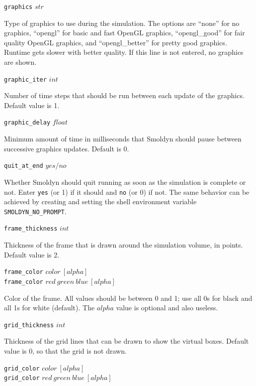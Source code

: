 \documentclass {scrbook}
\newcommand {\ttt} {\texttt}
\begin{document}
\begin{description}

\item{\ttt{graphics} $str$}

Type of graphics to use during the simulation. The options are ``none'' for no graphics, ``opengl'' for basic and fast OpenGL graphics, ``opengl\_good'' for fair quality OpenGL graphics, and ``opengl\_better'' for pretty good graphics. Runtime gets slower with better quality. If this line is not entered, no graphics are shown.

\item{\ttt{graphic\_iter} $int$}

Number of time steps that should be run between each update of the graphics. Default value is 1.

\item{\ttt{graphic\_delay} $float$}

Minimum amount of time in milliseconds that Smoldyn should pause between successive graphics updates. Default is 0.

\item{\ttt{quit\_at\_end} $yes/no$}

Whether Smoldyn should quit running as soon as the simulation is complete or not. Enter \ttt{yes} (or 1) if it should and \ttt{no} (or 0) if not. The same behavior can be achieved by creating and setting the shell environment variable \ttt{SMOLDYN\_NO\_PROMPT}.

\item{\ttt{frame\_thickness} $int$}

Thickness of the frame that is drawn around the simulation volume, in points. Default value is 2.

\item{\ttt{frame\_color} $color\ [alpha]$\\
\ttt{frame\_color} $red\ green\ blue\ [alpha]$}

Color of the frame. All values should be between 0 and 1; use all 0s for black and all 1s for white (default). The $alpha$ value is optional and also useless.

\item{\ttt{grid\_thickness} $int$}

Thickness of the grid lines that can be drawn to show the virtual boxes. Default value is 0, so that the grid is not drawn.

\item{\ttt{grid\_color} $color\ [alpha]$\\
\ttt{grid\_color} $red\ green\ blue\ [alpha]$}


\end{description}
\end{document}

